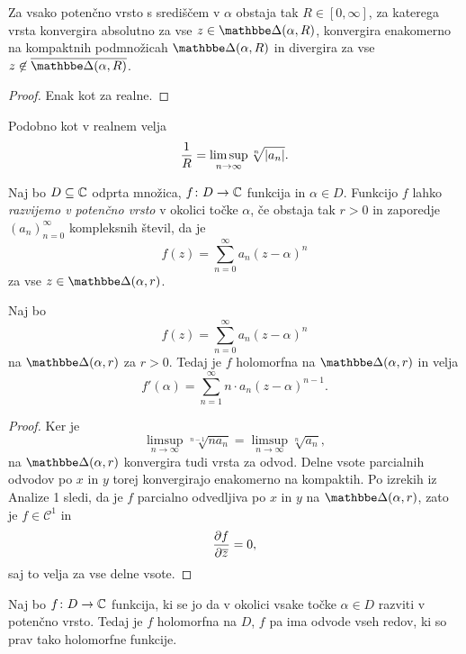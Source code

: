 \begin{izrek}
Za vsako potenčno vrsto s središčem v $\alpha$ obstaja tak
$R \in [0, \infty]$, za katerega vrsta konvergira absolutno za vse
$z \in \dsk(\alpha, R)$, konvergira enakomerno na kompaktnih
podmnožicah $\dsk(\alpha, R)$ in divergira za vse
$z \not \in \overline{\dsk(\alpha, R)}$.
\end{izrek}

\begin{proof}
Enak kot za realne.
\end{proof}

\begin{opomba}
Podobno kot v realnem velja
\[
\frac{1}{R} = \limsup_{n \to \infty} \sqrt[n]{\left\lvert a_n\right\rvert}.
\]
\end{opomba}

\begin{definicija}
Naj bo $D \subseteq \mathbb{C}$ odprta množica, $f \colon D \to \mathbb{C}$
funkcija in $\alpha \in D$. Funkcijo $f$ lahko \emph{razvijemo v
potenčno vrsto} v okolici
točke $\alpha$, če obstaja tak $r > 0$ in zaporedje
$(a_n)_{n=0}^\infty$ kompleksnih števil, da je
\[
f(z) = \sum_{n=0}^\infty a_n (z - \alpha)^n
\]
za vse $z \in \dsk(\alpha, r)$.
\end{definicija}

\begin{trditev}
Naj bo
\[
f(z) = \sum_{n=0}^\infty a_n (z - \alpha)^n
\]
na $\dsk(\alpha, r)$ za $r > 0$. Tedaj je $f$ holomorfna na
$\dsk(\alpha, r)$ in velja
\[
f'(\alpha) = \sum_{n=1}^\infty n \cdot a_n (z - \alpha)^{n-1}.
\]
\end{trditev}

\begin{proof}
Ker je
\[
\limsup_{n \to \infty} \sqrt[n-1]{n a_n} =
\limsup_{n \to \infty} \sqrt[n]{a_n},
\]
na $\dsk(\alpha, r)$ konvergira tudi vrsta za odvod. Delne vsote
parcialnih odvodov po $x$ in $y$ torej konvergirajo enakomerno na
kompaktih. Po izrekih iz Analize 1 sledi, da je $f$ parcialno
odvedljiva po $x$ in $y$ na $\dsk(\alpha, r)$, zato je
$f \in \mathcal{C}^1$ in
\[
\frac{\partial f}{\partial \overline{z}} = 0,
\]
saj to velja za vse delne vsote.
\end{proof}

\begin{posledica}
Naj bo $f \colon D \to \mathbb{C}$ funkcija, ki se jo da v okolici vsake
točke $\alpha \in D$ razviti v potenčno vrsto. Tedaj je $f$
holomorfna na $D$, $f$ pa ima odvode vseh redov, ki so prav tako
holomorfne funkcije.
\end{posledica}


